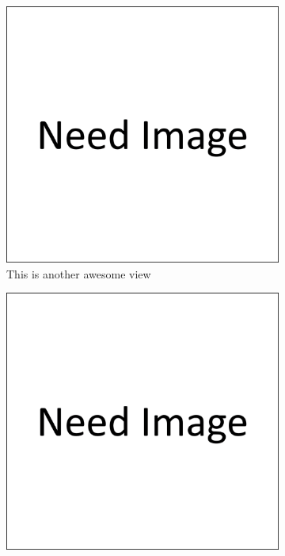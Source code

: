 \begin{figure}
    \centering
    \begin{subfigure}[b]{0.45\textwidth}
        \centering
        \includegraphics[width=\textwidth]{images/need image.png}
        \caption{This is another awesome view}
        \label{fig:another_awesome_view_a}
    \end{subfigure}
    \hfill
    \begin{subfigure}[b]{0.45\textwidth}
        \centering
        \includegraphics[width=\textwidth]{images/need image.png}

\end{subfigure}
\end{figure}
